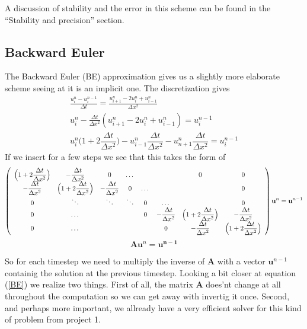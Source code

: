 \documentclass[a4paper,english, 10pt, twoside]{article}
\begin{document}
A discussion of stability and the error in this scheme can be found in the ``Stability and precision'' section.
\subsection{Backward Euler}
The Backward Euler (BE) approximation gives us a slightly more elaborate scheme seeing at it is an implicit one. The discretization 
gives
\begin{align*}
 \frac{u^{n}_i-u^{n-1}_i}{\Delta t} = \frac{u^n_{i+1}-2u^n_i + u^n_{i-1}}{\Delta x^2} \\
 u^n_i -\frac{\Delta t}{\Delta x^2}\left(u^n_{i+1}-2u^n_i + u^n_{i-1}\right) = u^{n-1}_i \\
 u^n_i\Big(1+2\dfrac{\Delta t}{\Delta x^2}\Big) -u^n_{i-1}\dfrac{\Delta t}{\Delta x^2} - u^n_{n+1}\dfrac{\Delta t}{\Delta x^2} 
 = u^{n-1}_i
\end{align*}
If we insert for a few steps we see that this takes the form of
\begin{align}\label{BE}
 \left(\begin{array}{c c c c c c c c}
        \Big(1+2\dfrac{\Delta t}{\Delta x^2}\Big) & -\dfrac{\Delta t}{\Delta x^2} &0 &\dots & & &0 &0 \\
        -\dfrac{\Delta t}{\Delta x^2} & \Big(1+2\dfrac{\Delta t}{\Delta x^2}\Big) & -\dfrac{\Delta t}{\Delta x^2} &0 &\dots & & &0 \\
        0& \ddots & \ddots & \ddots & 0 & \dots &  &0\\
        0& \dots & & &0&-\dfrac{\Delta t}{\Delta x^2} & \Big(1+2\dfrac{\Delta t}{\Delta x^2}\Big) & -\dfrac{\Delta t}{\Delta x^2}\\
         0& \dots & && &0&-\dfrac{\Delta t}{\Delta x^2} & \Big(1+2\dfrac{\Delta t}{\Delta x^2}\Big) 
       \end{array}\right)\mathbf{u}^n = \mathbf{u}^{n-1} 
\end{align}
\begin{equation*}
 \mathbf{A}\mathbf{u}^n = \mathbf{u^{n-1}}
\end{equation*}

So for each timestep we need to multiply the inverse of $\mathbf{A}$ with a vector $\mathbf{u}^{n-1}$ containig the solution at 
the previous timestep. Looking a bit closer at equation (\ref{BE}) we realize two things. First of all, the matrix 
$\mathbf{A}$ does'nt change at all throughout the computation so we can get away with invertig it once. Second, and perhaps 
more important, we allready have a very efficient solver for this kind of problem from project 1.\\
\end{document}
